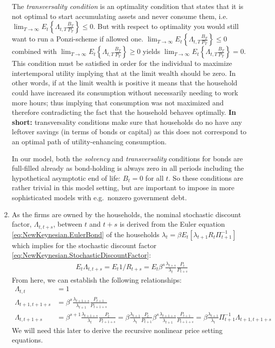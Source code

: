 \begin{enumerate}
The \emph{transversality condition} is an optimality condition that states
  that it is not optimal to start accumulating assets and never consume them,
  i.e. $\lim_{T \rightarrow \infty} E_t \left\{\Lambda_{t,T} \frac{B_T}{P_T}\right\} \leq 0$.
But with respect to optimality you would still want to run a Ponzi-scheme if allowed one.
  $\lim_{T \rightarrow \infty} E_t \left\{\Lambda_{t,T} \frac{B_T}{P_T}\right\} \leq 0$
  combined with
  $\lim_{T \rightarrow \infty} E_t \left\{\Lambda_{t,T} \frac{B_T}{P_T}\right\} \geq 0$
  yields
  $\lim_{T \rightarrow \infty} E_t \left\{\Lambda_{t,T} \frac{B_T}{P_T}\right\} = 0$.
This condition must be satisfied in order for the individual to maximize intertemporal utility implying
  that at the limit wealth should be zero.
In other words, if at the limit wealth is positive it means that the household could have increased its consumption without necessarily needing to work more hours;
  thus implying that consumption was not maximized and therefore contradicting the fact that the household behaves optimally.
\textbf{In short:} transversality conditions make sure that households do no have any leftover savings (in terms of bonds or capital)
  as this does not correspond to an optimal path of utility-enhancing consumption.
	
In our model, both the \emph{solvency} and \emph{transversality} conditions for bonds are full-filled already
  as bond-holding is always zero in all periods including the hypothetical asymptotic end of life: $B_t=0$ for all $t$.
So these conditions are rather trivial in this model setting, but are important to impose in more sophisticated models with e.g.\ nonzero government debt.

\item As the firms are owned by the households, the nominal stochastic discount factor,
$\Lambda_{t,t+s}$, between $t$ and $t+s$ is derived from the Euler equation \eqref{eq:NewKeynesian.EulerBond} of the households
$\lambda_t = \beta E_t \left[\lambda_{t+1} R_t \Pi_{t+1}^{-1} \right]$
which implies for the stochastic discount factor \eqref{eq:NewKeynesian.StochasticDiscountFactor}:
\begin{align*}
E_t \Lambda_{t,t+s} = E_t 1/R_{t+s} = E_t\beta^s \frac{\lambda_{t+s}}{\lambda_{t}}\frac{P_t}{P_{t+s}}
\end{align*}
From here, we can establish the following relationships:
\begin{align*}
\Lambda_{t,t} &= 1
\\
\Lambda_{t+1,t+1+s} & = \beta^s \frac{\lambda_{t+1+s}}{\lambda_{t+1}} \frac{P_{t+1}}{P_{t+1+s}}
\\
\Lambda_{t,t+1+s} & = \beta^{s+1} \frac{\lambda_{t+1+s}}{\lambda_{t}} \frac{P_{t}}{P_{t+1+s}} = \beta \frac{\lambda_{t+1}}{\lambda_{t}} \frac{P_{t}}{P_{t+1}} \beta^s \frac{\lambda_{t+1+s}}{\lambda_{t+1}} \frac{P_{t+1}}{P_{t+1+s}} = \beta \frac{\lambda_{t+1}}{\lambda_t} \Pi_{t+1}^{-1} \Lambda_{t+1,t+1+s}
\end{align*}
We will need this later to derive the recursive nonlinear price setting equations.


\end{enumerate}
